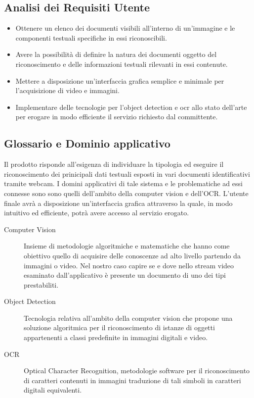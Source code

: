 \documentclass[12pt,a4paper]{article}
\begin{document}
\subsection{Analisi dei Requisiti Utente}

\begin{itemize}
    \item Ottenere un elenco dei documenti visibili all'interno di
        un'immagine e le componenti testuali specifiche in essi
        riconoscibili.
    \item Avere la possibilità di definire la natura dei documenti
        oggetto del riconoscimento e delle informazioni testuali
        rilevanti in essi contenute.
    \item Mettere a disposizione un'interfaccia grafica semplice e
        minimale per l'acquisizione di video e immagini.
    \item Implementare delle tecnologie per l'object detection e ocr
        allo stato dell'arte per erogare in modo efficiente il servizio
        richiesto dal committente.
\end{itemize}

\subsection{Glossario e Dominio applicativo}

Il prodotto risponde all'esigenza di individuare la tipologia ed
eseguire il riconoscimento dei prinicipali dati testuali esposti in vari
documenti identificativi tramite webcam. I domini applicativi di tale
sistema e le problematiche ad essi connesse sono sono quelli dell'ambito
della computer vision e dell'OCR. L'utente finale avrà a disposizione
un'interfaccia grafica attraverso la quale, in modo intuitivo ed
efficiente, potrà avere accesso al servizio erogato.

\begin{description}
    \item[Computer Vision] Insieme di metodologie algoritmiche e
        matematiche che hanno come obiettivo quello di acquisire delle
        conoscenze ad alto livello partendo da immagini o video. Nel
        nostro caso capire se e dove nello stream video esaminato
        dall'applicativo è presente un documento di uno dei tipi
        prestabiliti.
    \item[Object Detection] Tecnologia relativa all'ambito della
        computer vision che propone una soluzione algoritmica per il
        riconoscimento di istanze di oggetti appartenenti a classi
        predefinite in immagini digitali e video.
    \item[OCR] Optical Character Recognition, metodologie software per
        il riconoscimento di caratteri contenuti in immagini traduzione
        di tali simboli in caratteri digitali equivalenti.
\end{description}
\end{document}
